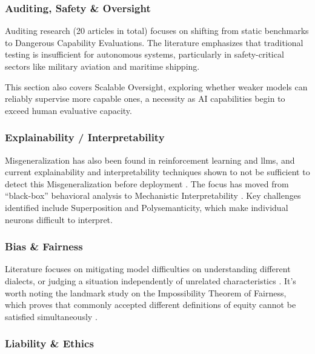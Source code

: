 		\subsubsection{Auditing, Safety \& Oversight}

			Auditing research (20 articles in total) focuses on shifting from static benchmarks to Dangerous Capability Evaluations. The literature emphasizes that traditional testing is insufficient for autonomous systems, particularly in safety-critical sectors like military aviation and maritime shipping. \begin{reviewed} This section also covers Scalable Oversight, exploring whether weaker models can reliably supervise more capable ones, a necessity as AI capabilities begin to exceed human evaluative capacity.

		\subsubsection{Explainability / Interpretability}

			Misgeneralization has also been found in reinforcement learning and \glspl{llm}, and current explainability and interpretability techniques shown to not be sufficient to detect this Misgeneralization before deployment \cite{langosco2022goal}. The focus has moved from ``black-box'' behavioral analysis to Mechanistic Interpretability \cite{anthropic2025biology}. Key challenges identified include Superposition and Polysemanticity, which make individual neurons difficult to interpret.

		\subsubsection{Bias \& Fairness}

			Literature focuses on mitigating model difficulties on understanding different dialects, or judging a situation independently of unrelated characteristics \cite{li_instance-consistent_2025}. It's worth noting the landmark study on the Impossibility Theorem of Fairness, which proves that commonly accepted different definitions of equity cannot be satisfied simultaneously \cite{kleinberg2016inherent}.

\end{reviewed}

		\subsubsection{Liability \& Ethics}

